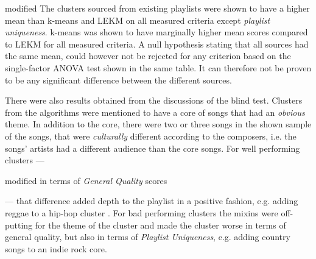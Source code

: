 \documentclass[../report.tex]{subfiles}
\begin{document}
\begin{color}{modified}
  The clusters sourced from existing playlists were shown to have a higher mean than k-means and LEKM on all measured criteria except \textit{playlist uniqueness}. k-means was shown to have marginally higher mean scores compared to LEKM for all measured criteria. A null hypothesis stating that all sources had the same mean, could however not be rejected for any criterion based on the single-factor ANOVA test shown in the same table. It can therefore not be proven to be any significant difference between the different sources.


\end{color}

There were also results obtained from the discussions of the blind test. Clusters from the algorithms were mentioned to have a core of songs that had an \textit{obvious} theme. In addition to the core, there were two or three songs in the shown sample of the songs, that were \textit{culturally} different according to the composers, i.e. the songs' artists had a different audience than the core songs. For well performing clusters --- \begin{color}{modified} in terms of \textit{General Quality} scores \end{color} --- that difference added depth to the playlist in a positive fashion, e.g. adding reggae to a hip-hop cluster . For bad performing clusters the mixins were off-putting for the theme of the cluster and made the cluster worse in terms of general quality, but also in terms of \textit{Playlist Uniqueness}, e.g. adding country songs to an indie rock core.
\end{document}
